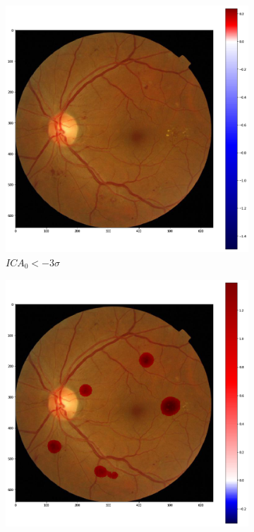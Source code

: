 \documentclass[review]{elsarticle}
\theoremstyle{definition} %
\theoremstyle{remark}
\begin{document}
\begin{figure}[h!]
	\centering
	\begin{subfigure}[b]{0.32\textwidth}
		\centering
		\includegraphics[width=\textwidth]{./figures/ica_retine_maps/G2-P3/m10.png}
		\caption{$ICA_0 < - 3 \sigma$}	
	\end{subfigure}
	\begin{subfigure}[b]{0.32\textwidth}
		\centering
		\includegraphics[width=\textwidth]{./figures/ica_retine_maps/G2-P3/m11.png}

\end{subfigure}
\end{figure}
\end{document}
